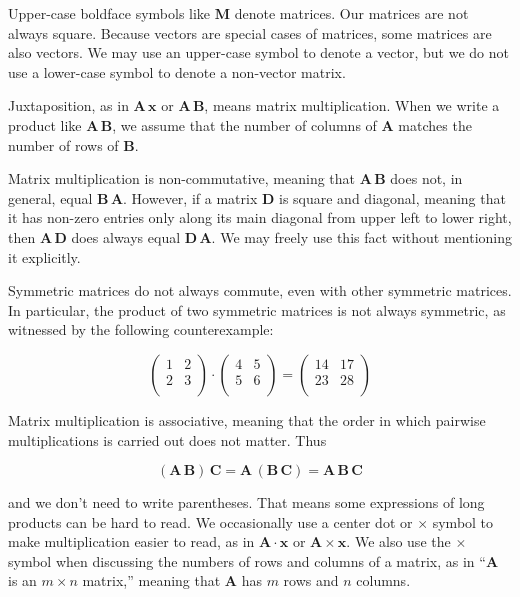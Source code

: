 \documentclass[10pt,oneside,x11names]{article}
\begin{document}
Upper-case
boldface symbols like \(\mathbold{M}\) denote matrices. Our matrices are not
always square. Because vectors are
special cases of matrices, some matrices are also vectors. We may use an
upper-case symbol to denote a vector, but we do not use a lower-case symbol to
denote a non-vector matrix.

Juxtaposition, as in
\(\mathbold{A}\,\mathbold{x}\) or \(\mathbold{A}\,\mathbold{B}\), means matrix
multiplication. 
When we write a product like
\(\mathbold{A}\,\mathbold{B}\), we assume that the number of columns of
\(\mathbold{A}\) matches the number of rows of \(\mathbold{B}\). 

Matrix multiplication is non-commutative, meaning that
\(\mathbold{A}\,\mathbold{B}\) does not, in general, equal
\(\mathbold{B}\,\mathbold{A}\). However, if a matrix \(\mathbold{D}\) is square and
diagonal,
meaning that it has non-zero entries only along its main diagonal from upper
left to lower right, then \(\mathbold{A}\,\mathbold{D}\) does always equal
\(\mathbold{D}\,\mathbold{A}\). We may freely use this fact without mentioning it
explicitly.

Symmetric matrices do not always
commute, even with other symmetric matrices. In particular, the product of two
symmetric matrices is not always symmetric, as witnessed by the following
counterexample:

\begin{equation*}
\left(
\begin{array}{cc}
 1 & 2 \\
 2 & 3 \\
\end{array}
\right)\cdot\left(
\begin{array}{cc}
 4 & 5 \\
 5 & 6 \\
\end{array}
\right)
=
\left(
\begin{array}{cc}
 14 & 17 \\
 23 & 28 \\
\end{array}
\right)
\end{equation*}


Matrix multiplication is associative, meaning that the order in which pairwise
multiplications is carried out does not matter. Thus 

\[(\mathbold{A}\,\mathbold{B})\,\mathbold{C}=\mathbold{A}\,(\mathbold{B}\,\mathbold{C})=\mathbold{A}\,\mathbold{B}\,\mathbold{C}\]

\noindent and we don't need to write parentheses. That means
some expressions of long products can be hard to read. We occasionally use
a center dot or \(\times\) symbol to make multiplication easier to read, as in
\(\mathbold{A}\cdot\mathbold{x}\) or \(\mathbold{A}\times\mathbold{x}\). We also use
the \(\times\) symbol when discussing the numbers of rows and columns of a matrix,
as in ``\(\mathbold{A}\) is an \(m\times n\) matrix,'' meaning that \(\mathbold{A}\)
has \(m\) rows and \(n\) columns.
\end{document}
